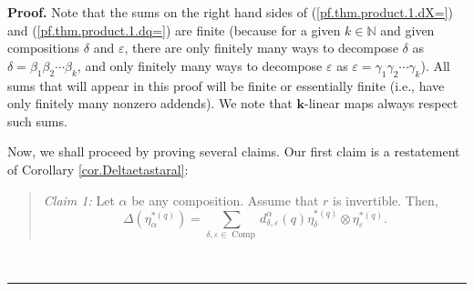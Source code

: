 \documentclass[numbers=enddot,12pt,final,onecolumn,notitlepage]{scrartcl}%
\theoremstyle{definition}
\newenvironment{statement}{\begin{quote}}{\end{quote}}
\newenvironment{proof}[1][Proof]{\noindent\textbf{#1.} }{\ \rule{0.5em}{0.5em}}
\let\sumnonlimits\sum
\renewcommand{\sum}{\sumnonlimits\limits}
\begin{document}
\begin{proof}
Note that the sums on the right hand sides of (\ref{pf.thm.product.1.dX=}) and
(\ref{pf.thm.product.1.dq=}) are finite (because for a given $k\in\mathbb{N}$
and given compositions $\delta$ and $\varepsilon$, there are only finitely
many ways to decompose $\delta$ as $\delta=\beta_{1}\beta_{2}\cdots\beta_{k}$,
and only finitely many ways to decompose $\varepsilon$ as $\varepsilon
=\gamma_{1}\gamma_{2}\cdots\gamma_{k}$). All sums that will appear in this
proof will be finite or essentially finite (i.e., have only finitely many
nonzero addends). We note that $\mathbf{k}$-linear maps always respect such sums.

Now, we shall proceed by proving several claims. Our first claim is a
restatement of Corollary \ref{cor.Deltaetastaral}:

\begin{statement}
\textit{Claim 1:} Let $\alpha$ be any composition. Assume that $r$ is
invertible. Then,%
\begin{equation}
\Delta\left(  \eta_{\alpha}^{\ast\left(  q\right)  }\right)  =\sum
_{\delta,\varepsilon\in\operatorname*{Comp}}d_{\delta,\varepsilon}^{\alpha
}\left(  q\right)  \eta_{\delta}^{\ast\left(  q\right)  }\otimes
\eta_{\varepsilon}^{\ast\left(  q\right)  }. \label{pf.thm.product.c1}%
\end{equation}

\end{statement}


\end{proof}
\end{document}
